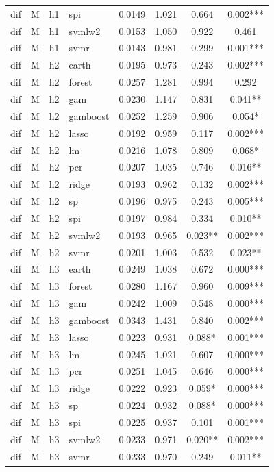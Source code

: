 \begin{ThreePartTable}
\begin{longtable}[t]{llclcccc}
dif & M & h1 & spi & 0.0149 & 1.021 & 0.664 & 0.002***\\
dif & M & h1 & svmlw2 & 0.0153 & 1.050 & 0.922 & 0.461\\
dif & M & h1 & svmr & 0.0143 & 0.981 & 0.299 & 0.001***\\
\addlinespace
dif & M & h2 & earth & 0.0195 & 0.973 & 0.243 & 0.002***\\
dif & M & h2 & forest & 0.0257 & 1.281 & 0.994 & 0.292\\
dif & M & h2 & gam & 0.0230 & 1.147 & 0.831 & 0.041**\\
dif & M & h2 & gamboost & 0.0252 & 1.259 & 0.906 & 0.054*\\
dif & M & h2 & lasso & 0.0192 & 0.959 & 0.117 & 0.002***\\
dif & M & h2 & lm & 0.0216 & 1.078 & 0.809 & 0.068*\\
dif & M & h2 & pcr & 0.0207 & 1.035 & 0.746 & 0.016**\\
dif & M & h2 & ridge & 0.0193 & 0.962 & 0.132 & 0.002***\\
dif & M & h2 & sp & 0.0196 & 0.975 & 0.243 & 0.005***\\
dif & M & h2 & spi & 0.0197 & 0.984 & 0.334 & 0.010**\\
dif & M & h2 & svmlw2 & 0.0193 & 0.965 & 0.023** & 0.002***\\
dif & M & h2 & svmr & 0.0201 & 1.003 & 0.532 & 0.023**\\
\addlinespace
dif & M & h3 & earth & 0.0249 & 1.038 & 0.672 & 0.000***\\
dif & M & h3 & forest & 0.0280 & 1.167 & 0.960 & 0.009***\\
dif & M & h3 & gam & 0.0242 & 1.009 & 0.548 & 0.000***\\
dif & M & h3 & gamboost & 0.0343 & 1.431 & 0.840 & 0.002***\\
dif & M & h3 & lasso & 0.0223 & 0.931 & 0.088* & 0.001***\\
dif & M & h3 & lm & 0.0245 & 1.021 & 0.607 & 0.000***\\
dif & M & h3 & pcr & 0.0251 & 1.045 & 0.646 & 0.000***\\
dif & M & h3 & ridge & 0.0222 & 0.923 & 0.059* & 0.000***\\
dif & M & h3 & sp & 0.0224 & 0.932 & 0.088* & 0.000***\\
dif & M & h3 & spi & 0.0225 & 0.937 & 0.101 & 0.001***\\
dif & M & h3 & svmlw2 & 0.0233 & 0.971 & 0.020** & 0.002***\\
dif & M & h3 & svmr & 0.0233 & 0.970 & 0.249 & 0.011**\\

\end{longtable}
\end{ThreePartTable}
